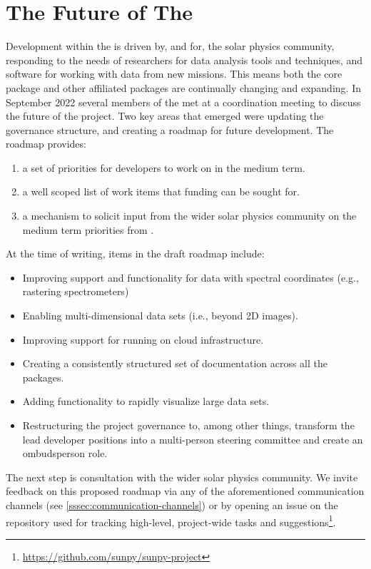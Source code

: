 \section{The Future of The \sunpyproj}
\label{sec:the-future-of-the-sunpyproj}

Development within the \sunpyproj is driven by, and for, the solar physics community, responding to the needs of researchers for data analysis tools and techniques, and software for working with data from new missions.
This means both the \sunpypkg core package and other affiliated packages are continually changing and expanding.
In September 2022 several members of the \sunpyproj met at a coordination meeting to discuss the future of the project.
Two key areas that emerged were updating the governance structure, and creating a roadmap for future development.
The roadmap provides:
\begin{enumerate}
    \item a set of priorities for developers to work on in the medium term.
    \item a well scoped list of work items that funding can be sought for.
    \item a mechanism to solicit input from the wider solar physics community on the medium term priorities from \sunpyproj.
\end{enumerate}

At the time of writing, items in the draft roadmap include:
\begin{itemize}
    \item Improving support and functionality for data with spectral coordinates (e.g., rastering spectrometers)
    \item Enabling multi-dimensional data sets (i.e., beyond 2D images).
    \item Improving support for running \sunpypkg on cloud infrastructure.
    \item Creating a consistently structured set of documentation across all the \sunpyproj packages.
    \item Adding functionality to rapidly visualize large data sets.
    \item Restructuring the project governance to, among other things, transform the lead developer positions into a multi-person steering committee and create an ombudsperson role.
\end{itemize}

The next step is consultation with the wider solar physics community.
We invite feedback on this proposed roadmap via any of the aforementioned communication channels (see \autoref{sssec:communication-channels}) or by opening an issue on the repository used for tracking high-level, project-wide tasks and suggestions\footnote{\url{https://github.com/sunpy/sunpy-project}}.
